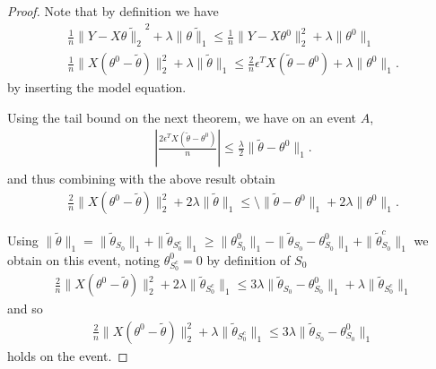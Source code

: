 \begin{proof}
  Note that by definition we have
  \begin{align}
    \frac{1}{n} \| Y - X \tilde{ \theta{ \|_2}}^2 + \lambda{ \|
      \tilde{ \theta{ \|_1}}} \leq \frac{1}{n} \| Y - X \theta{^0}
    \|_{2}^{2} + \lambda \| \theta^{0} \|_{1} \\
    \frac{1}{n} \| X(\theta^{0} - \tilde \theta) \|_{2}^{2} + \lambda
    \| \tilde \theta \|_{1} \leq \frac{2}{n} \epsilon^{T}X(\tilde
    \theta - \theta^{0}) + \lambda \| \theta^{0} \|_{1}.
  \end{align} by inserting the model equation.

  Using the tail bound on the next theorem, we have on an event $A$,
  \begin{align}
    \label{eq:12}
    |\frac{2 \epsilon^{T} X(\tilde \theta - \theta^{0})}{n}| \leq
    \frac{\lambda}{2} \| \tilde \theta - \theta^{0} \|_{1}.
  \end{align}
  and thus combining with the above result obtain
  \begin{align}
    \label{eq:45}
    \frac{2}{n} \| X(\theta^{0} - \tilde \theta) \|_{2}^{2} + 2
    \lambda \| \tilde \theta \|_{1} \leq \setminus \| \tilde \theta -
    \theta^{0} \|_{1} + 2 \lambda \| \theta^{0} \|_{1}.
  \end{align}

  Using $\|\tilde \theta \|_{1} = \| \tilde \theta_{S_{0}} \|_{1} + \|
  \tilde \theta_{S_{0}^{c}} \|_{1} \geq \| \theta_{S_{0}}^{0} \|_{1} -
  \| \tilde \theta_{S_{0}} - \theta^{0}_{S_{0}} \|_{1} + \| \tilde
  \theta_{S_{0}}^{c} \|_{1}$ we obtain on this event, noting
  $\theta_{S_{0}^{c}}^{0} = 0$ by definition of $S_{0}$
  \begin{align}
    \label{eq:61}
    \frac{2}{n} \| X(\theta^{0} - \tilde \theta) \|_{2}^{2} + 2
    \lambda \| \tilde \theta_{S_{0}^{c}} \|_{1} \leq 3 \lambda \|
    \tilde \theta_{S_{0}} - \theta^{0}_{S_{0}} \|_{1} + \lambda \|
    \tilde \theta_{S_{0}^{c}} \|_{1}
  \end{align} and so
  \begin{align}
    \label{eq:63}
    \frac{2}{n} \|X(\theta^{0} - \tilde \theta) \|_{2}^{2} + \lambda
    \| \tilde \theta_{S_{0}^{c}} \|_{1} \leq 3 \lambda \| \tilde
    \theta_{S_{0}} - \theta^{0}_{S_{0}} \|_{1}
  \end{align} holds on the event.


\end{proof}
